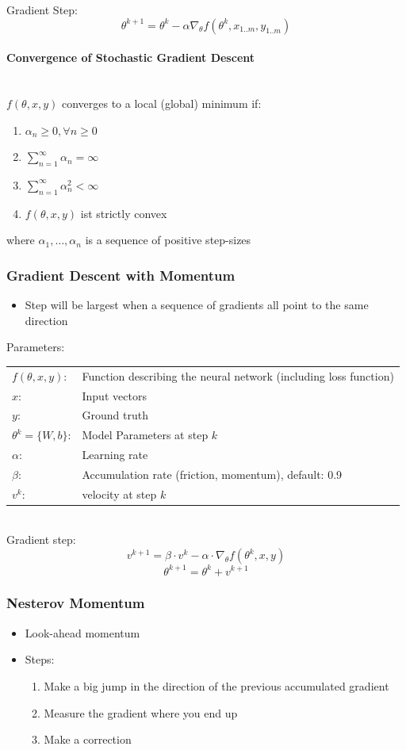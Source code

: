 \documentclass[10pt,a4paper]{article}
\begin{document}
Gradient Step:
$$
	\theta^{k + 1} = \theta^k - \alpha \nabla_\theta f(\theta^k, x_{1..m}, y_{1..m})
$$

\paragraph{Convergence of Stochastic Gradient Descent} ~\\
$f(\theta, x, y)$ converges to a local (global) minimum if:
\begin{enumerate}
	\item $\alpha_n ≥ 0, \forall n ≥ 0$
	\item $\sum_{n = 1}^∞ \alpha_n = ∞$
	\item $\sum_{n = 1}^∞ \alpha_n^2 < ∞$
	\item $f(\theta, x, y)$ ist strictly convex
\end{enumerate}
where $\alpha_1, \dots, \alpha_n$ is a sequence of positive step-sizes

\subsubsection{Gradient Descent with Momentum}
\begin{itemize}
	\item Step will be largest when a sequence of gradients all point to the same direction
\end{itemize}

Parameters: \\
\begin{tabular}{ll}
	$f(\theta, x, y)$: & Function describing the neural network (including loss function) \\
	$x$: & Input vectors \\
	$y$: & Ground truth \\
	$\theta^k = \{W, b\}$: & Model Parameters at step $k$\\
	$\alpha$: & Learning rate \\
	$\beta$: & Accumulation rate (friction, momentum), default: 0.9 \\
	$v^k$: & velocity at step $k$ \\
\end{tabular} \\

Gradient step:
$$
	v^{k + 1} = \beta ⋅ v^k - \alpha ⋅ \nabla_\theta f(\theta^k, x, y)
$$
$$
	\theta^{k + 1} = \theta^k + v^{k + 1}
$$

\subsubsection{Nesterov Momentum}
\begin{itemize}
	\item Look-ahead momentum
	\item Steps:
	\begin{enumerate}
		\item Make a big jump in the direction of the previous accumulated gradient
		\item Measure the gradient where you end up
		\item Make a correction
	\end{enumerate}
\end{itemize}
\end{document}
